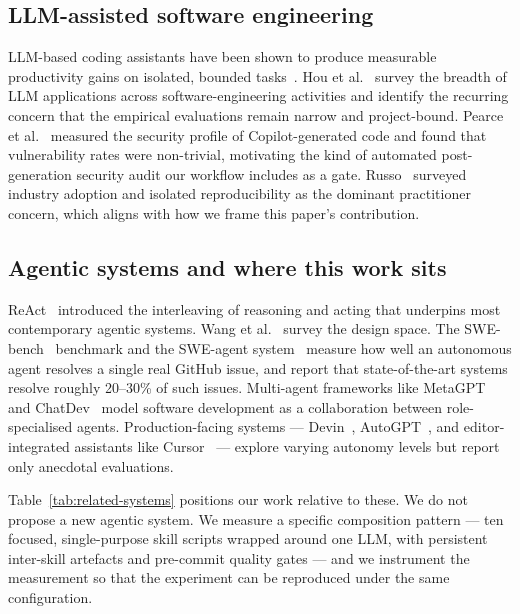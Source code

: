 \documentclass[journal]{IEEEtran}
\begin{document}
\subsection{LLM-assisted software engineering}

LLM-based coding assistants have been shown to produce measurable
productivity gains on isolated, bounded
tasks~\cite{peng2023copilot,vaithilingam2022expectation}.
Hou et al.~\cite{hou2024llmse} survey the breadth of LLM
applications across software-engineering activities and identify
the recurring concern that the empirical evaluations remain narrow
and project-bound. Pearce et al.~\cite{pearce2025secureness}
measured the security profile of Copilot-generated code and found
that vulnerability rates were non-trivial, motivating the kind of
automated post-generation security audit our workflow includes as
a gate. Russo~\cite{russo2024navigating} surveyed industry
adoption and isolated reproducibility as the dominant practitioner
concern, which aligns with how we frame this paper's contribution.

\subsection{Agentic systems and where this work sits}

ReAct~\cite{yao2023react} introduced the interleaving of reasoning
and acting that underpins most contemporary agentic systems.
Wang et al.~\cite{wang2024agents} survey the design space. The
SWE-bench~\cite{jimenez2024swebench} benchmark and the SWE-agent
system~\cite{yang2024sweagent} measure how well an autonomous agent
resolves a single real GitHub issue, and report that
state-of-the-art systems resolve roughly 20--30\% of such issues.
Multi-agent frameworks like MetaGPT~\cite{hong2024metagpt} and
ChatDev~\cite{qian2024chatdev} model software development as a
collaboration between role-specialised agents. Production-facing
systems --- Devin~\cite{cognition2024devin}, AutoGPT~\cite{autogpt2023},
and editor-integrated assistants like Cursor~\cite{cursor2024} ---
explore varying autonomy levels but report only anecdotal
evaluations.

Table~\ref{tab:related-systems} positions our work relative to
these. We do not propose a new agentic system. We measure a
specific composition pattern --- ten focused, single-purpose
skill scripts wrapped around one LLM, with persistent inter-skill
artefacts and pre-commit quality gates --- and we instrument the
measurement so that the experiment can be reproduced under the
same configuration.
\end{document}
